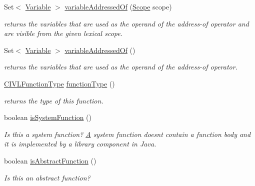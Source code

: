 \begin{DoxyCompactItemize}
\item 
Set$<$ \hyperlink{interfaceedu_1_1udel_1_1cis_1_1vsl_1_1civl_1_1model_1_1IF_1_1variable_1_1Variable}{Variable} $>$ \hyperlink{classedu_1_1udel_1_1cis_1_1vsl_1_1civl_1_1model_1_1common_1_1CommonFunction_a80da194a4e0b2a638e109a32179b28d3}{variable\+Addressed\+Of} (\hyperlink{interfaceedu_1_1udel_1_1cis_1_1vsl_1_1civl_1_1model_1_1IF_1_1Scope}{Scope} scope)
\begin{DoxyCompactList}\small\item\em returns the variables that are used as the operand of the address-\/of operator and are visible from the given lexical scope. \end{DoxyCompactList}\item 
Set$<$ \hyperlink{interfaceedu_1_1udel_1_1cis_1_1vsl_1_1civl_1_1model_1_1IF_1_1variable_1_1Variable}{Variable} $>$ \hyperlink{classedu_1_1udel_1_1cis_1_1vsl_1_1civl_1_1model_1_1common_1_1CommonFunction_a06ba50ef4ea90043e70a982742a61395}{variable\+Addressed\+Of} ()
\begin{DoxyCompactList}\small\item\em returns the variables that are used as the operand of the address-\/of operator. \end{DoxyCompactList}\item 
\hyperlink{interfaceedu_1_1udel_1_1cis_1_1vsl_1_1civl_1_1model_1_1IF_1_1type_1_1CIVLFunctionType}{C\+I\+V\+L\+Function\+Type} \hyperlink{classedu_1_1udel_1_1cis_1_1vsl_1_1civl_1_1model_1_1common_1_1CommonFunction_ad5126b6d6e5e6321f8e33bea5e7ed1b6}{function\+Type} ()
\begin{DoxyCompactList}\small\item\em returns the type of this function. \end{DoxyCompactList}\item 
boolean \hyperlink{classedu_1_1udel_1_1cis_1_1vsl_1_1civl_1_1model_1_1common_1_1CommonFunction_a76f729689426924438dd93a6db623bef}{is\+System\+Function} ()
\begin{DoxyCompactList}\small\item\em Is this a system function? \hyperlink{structA}{A} system function doesn\textquotesingle{}t contain a function body and it is implemented by a library component in Java. \end{DoxyCompactList}\item 
boolean \hyperlink{classedu_1_1udel_1_1cis_1_1vsl_1_1civl_1_1model_1_1common_1_1CommonFunction_a7d81b1ea5cc8fc70a70c547015d2b4fd}{is\+Abstract\+Function} ()
\begin{DoxyCompactList}\small\item\em Is this an abstract function? \end{DoxyCompactList}\item 

\end{DoxyCompactItemize}
